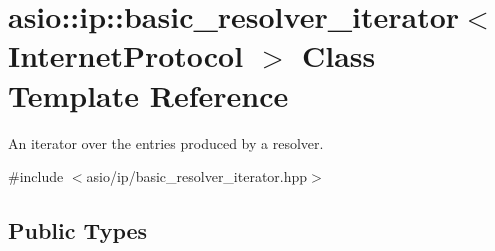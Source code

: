 \hypertarget{classasio_1_1ip_1_1basic__resolver__iterator}{}\section{asio\+:\+:ip\+:\+:basic\+\_\+resolver\+\_\+iterator$<$ Internet\+Protocol $>$ Class Template Reference}
\label{classasio_1_1ip_1_1basic__resolver__iterator}


An iterator over the entries produced by a resolver.  




{\ttfamily \#include $<$asio/ip/basic\+\_\+resolver\+\_\+iterator.\+hpp$>$}

\subsection*{Public Types}
